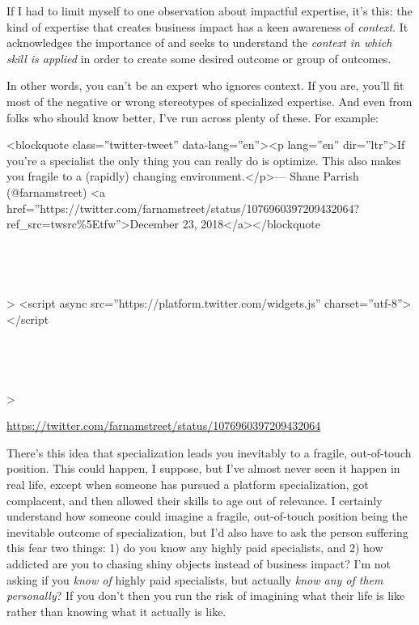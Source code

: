 If I had to limit myself to one observation about impactful expertise, it's this: the kind of expertise that creates business impact has a keen awareness of \emph{context}. It acknowledges the importance of and seeks to understand the \emph{context in which skill is applied} in order to create some desired outcome or group of outcomes.

In other words, you can't be an expert who ignores context. If you are, you'll fit most of the negative or wrong stereotypes of specialized expertise. And even from folks who should know better, I've run across plenty of these. For example:

\textless{}blockquote class=''twitter-tweet'' data-lang=''en''\textgreater{}\textless{}p lang=''en'' dir=''ltr''\textgreater{}If you'{}re a specialist the only thing you can really do is optimize. This also makes you fragile to a (rapidly) changing environment.\textless{}/p\textgreater{}---{} Shane Parrish (@farnamstreet) \textless{}a href=''https://twitter.com/farnamstreet/status/1076960397209432064?ref\_src=twsrc\%5Etfw''\textgreater{}December 23, 2018\textless{}/a\textgreater{}\textless{}/blockquote\\\\\\\\\\\textgreater{}
\textless{}script async src=''https://platform.twitter.com/widgets.js'' charset=''utf-8''\textgreater{}\textless{}/script\\\\\\\\\\\textgreater{}

\href{https://twitter.com/farnamstreet/status/1076960397209432064}{https://twitter.com/farnamstreet/status/1076960397209432064}



There's this idea that specialization leads you inevitably to a fragile, out-of-touch position. This could happen, I suppose, but I've almost never seen it happen in real life, except when someone has pursued a platform specialization, got complacent, and then allowed their skills to age out of relevance. I certainly understand how someone could imagine a fragile, out-of-touch position being the inevitable outcome of specialization, but I'd also have to ask the person suffering this fear two things: 1) do you know any highly paid specialists, and 2) how addicted are you to chasing shiny objects instead of business impact? I'm not asking if you \emph{know of} highly paid specialists, but actually \emph{know any of them personally}? If you don't then you run the risk of imagining what their life is like rather than knowing what it actually is like.

